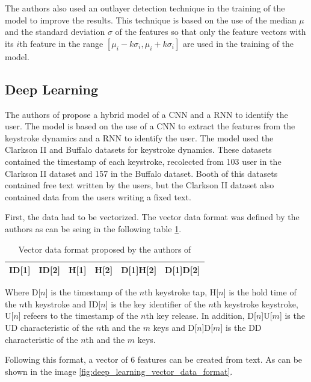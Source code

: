 The authors also used an outlayer detection technique in the training of the model to improve the results. This technique is based on the use of the median $\mu$ and the standard deviation $\sigma$ of the features so that only the feature vectors with  its $i$th feature in the range $[\mu_i - k\sigma_i, \mu_i + k\sigma_i]$ are used in the training of the model.

\subsection{Deep Learning}

The authors of \cite{deep_learning} propose a hybrid model of a CNN and a RNN to identify the user. The model is based on the use of a CNN to extract the features from the keystroke dynamics and a RNN to identify the user. The model used the Clarkson II and Buffalo datasets for keystroke dynamics. These datasets contained the timestamp of each keystroke, recolected from 103 user in the Clarkson II dataset and 157 in the Buffalo dataset. Booth of this datasets contained free text written by the users, but the Clarkson II dataset also contained data from the users writing a fixed text.

First, the data had to be vectorized. The vector data format was defined by the authors as can be seing in the following table \ref{tab:deep_learning_vector_data_format}.

\begin{table}[H]
	\centering
	\begin{tabular}{|c|c|c|c|c|c|}
		\hline
		ID{[}1{]} & ID{[}2{]} & H{[}1{]} & H{[}2{]} & D{[}1{]}H{[}2{]} & D{[}1{]}D{[}2{]} \\ \hline
	\end{tabular}
	\caption{Vector data format proposed by the authors of \cite{deep_learning}}
	\label{tab:deep_learning_vector_data_format}
\end{table}

Where D[$n$] is the timestamp of the $n$th keystroke tap, H[$n$] is the hold time of the $n$th keystroke and ID[$n$] is the key identifier of the $n$th keystroke keystroke, U[$n$] refeers to the timestamp of the $n$th key release. In addition, D[$n$]U[$m$] is the UD characteristic of the $n$th and the $m$ keys and D[$n$]D[$m$] is the DD characteristic of the $n$th and the $m$ keys.

Following this format, a vector of 6 features can be created from text. As can be shown in the image \ref{fig:deep_learning_vector_data_format}.


